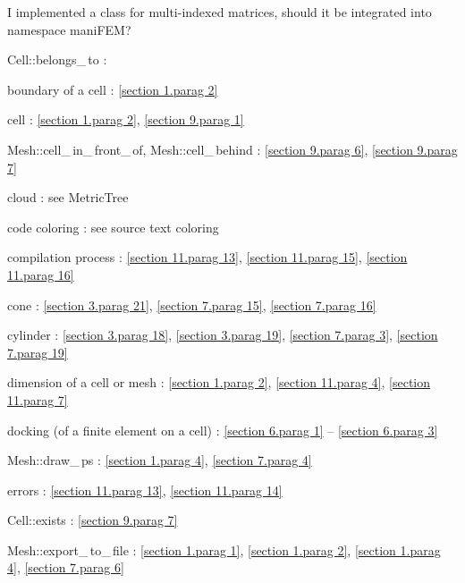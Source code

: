 \documentclass[a4paper]{scrreprt}
\def\numb{}
\newcommand\verm[1]{\textcolor{manif}{#1}}
\renewcommand\tt{\normalfont\ttfamily}
\begin{document}
\noindent I implemented a class for multi-indexed matrices, should it be integrated into
{\small\tt namespace} {\small\tt\verm{maniFEM}}\;?





\noindent
{\small\tt\verm{Cell}::belongs\_\,to} : 

\noindent
boundary of a cell : \ref{\numb section 1.\numb parag 2}

\noindent
cell : \ref{\numb section 1.\numb parag 2}, \ref{\numb section 9.\numb parag 1}

\noindent
{\small\tt\verm{Mesh}::cell\_\,in\_\,front\_\,of},
{\small\tt\verm{Mesh}::cell\_\,behind} : \ref{\numb section 9.\numb parag 6},
\ref{\numb section 9.\numb parag 7}

\noindent
cloud : see {\small\tt\verm{MetricTree}}

\noindent
code coloring : see source text coloring


\noindent
compilation process : \ref{\numb section 11.\numb parag 13},
\ref{\numb section 11.\numb parag 15}, \ref{\numb section 11.\numb parag 16}

\noindent
cone : \ref{\numb section 3.\numb parag 21}, \ref{\numb section 7.\numb parag 15},
\ref{\numb section 7.\numb parag 16}

\noindent
cylinder : \ref{\numb section 3.\numb parag 18}, \ref{\numb section 3.\numb parag 19},
\ref{\numb section 7.\numb parag 3}, \ref{\numb section 7.\numb parag 19}

\noindent
dimension of a cell or mesh : \ref{\numb section 1.\numb parag 2},
\ref{\numb section 11.\numb parag 4}, \ref{\numb section 11.\numb parag 7}

\noindent
docking (of a finite element on a cell) :
\ref{\numb section 6.\numb parag 1} -- \ref{\numb section 6.\numb parag 3}

\noindent
{\small\tt\verm{Mesh}::draw\_\,ps} : \ref{\numb section 1.\numb parag 4},
\ref{\numb section 7.\numb parag 4}

\noindent
errors : \ref{\numb section 11.\numb parag 13}, \ref{\numb section 11.\numb parag 14}

\noindent
{\small\tt\verm{Cell}::exists} : \ref{\numb section 9.\numb parag 7}

\noindent
{\small\tt\verm{Mesh}::export\_\,to\_\,file} : \ref{\numb section 1.\numb parag 1},
\ref{\numb section 1.\numb parag 2}, \ref{\numb section 1.\numb parag 4},
\ref{\numb section 7.\numb parag 6}
\end{document}
